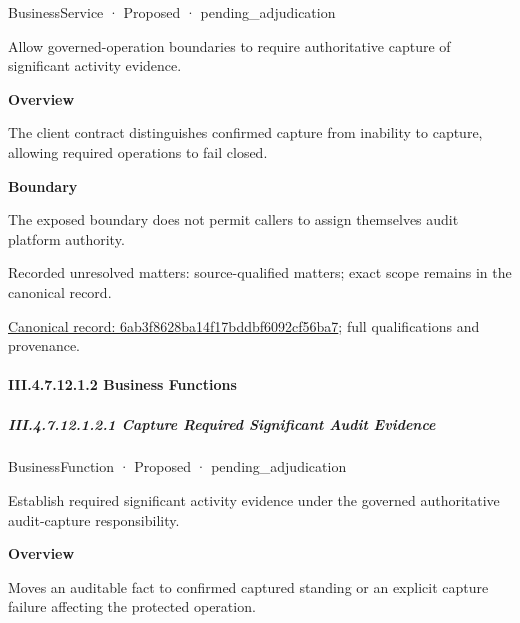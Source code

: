 \label{element:6ab3f8628ba14f17bddbf6092cf56ba7}
{\small BusinessService · Proposed · pending\_adjudication}\par

Allow governed-operation boundaries to require authoritative capture of significant activity evidence.



\textbf{Overview}



The client contract distinguishes confirmed capture from inability to capture, allowing required operations to fail closed.



\textbf{Boundary}



The exposed boundary does not permit callers to assign themselves audit platform authority.


{\small Recorded unresolved matters: source-qualified matters; exact scope remains in the canonical record.}\par
{\footnotesize \href{../../../../../../../continuum/business/business-service/6ab3f8628ba14f17bddbf6092cf56ba7.md}{Canonical record: 6ab3f8628ba14f17bddbf6092cf56ba7}; full qualifications and provenance.}\par
\paragraph*{III.4.7.12.1.2 Business Functions}
\label{navigation:III.4.7.12.1.2}

\subparagraph*{III.4.7.12.1.2.1 Capture Required Significant Audit Evidence}
\label{navigation:III.4.7.12.1.2.1}

\label{element:c8e614257cf14bd1878df894455f21fb}
{\small BusinessFunction · Proposed · pending\_adjudication}\par

Establish required significant activity evidence under the governed authoritative audit-capture responsibility.



\textbf{Overview}



Moves an auditable fact to confirmed captured standing or an explicit capture failure affecting the protected operation.



